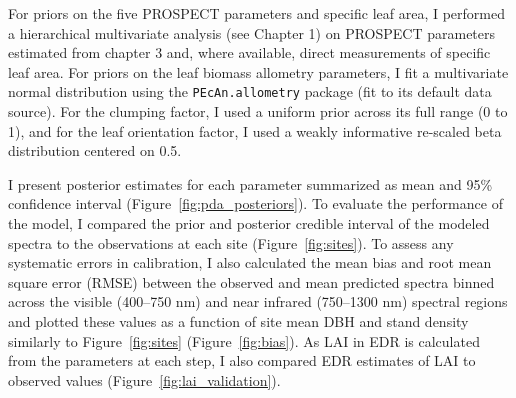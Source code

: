 For priors on the five PROSPECT parameters and specific leaf area, I performed a hierarchical multivariate analysis (see Chapter 1) on PROSPECT parameters estimated from chapter 3 and, where available, direct measurements of specific leaf area. 
For priors on the leaf biomass allometry parameters, I fit a multivariate normal distribution using the \texttt{PEcAn.allometry} package (fit to its default data source). %
% 
% 
For the clumping factor, I used a uniform prior across its full range (0 to 1), and for the leaf orientation factor, I used a weakly informative re-scaled beta distribution centered on 0.5.

I present posterior estimates for each parameter summarized as mean and 95\% confidence interval (Figure~\ref{fig:pda_posteriors}).
To evaluate the performance of the model, I compared the prior and posterior credible interval of the modeled spectra to the observations at each site (Figure~\ref{fig:sites}).
% 
% 
To assess any systematic errors in calibration, I also calculated the mean bias and root mean square error (RMSE) between the observed and mean predicted spectra binned across the visible (400--750 nm) and near infrared (750--1300 nm) spectral regions and plotted these values as a function of site mean DBH and stand density similarly to Figure~\ref{fig:sites} (Figure~\ref{fig:bias}).
As LAI in EDR is calculated from the parameters at each step, I also compared EDR estimates of LAI to observed values (Figure~\ref{fig:lai_validation}). %


